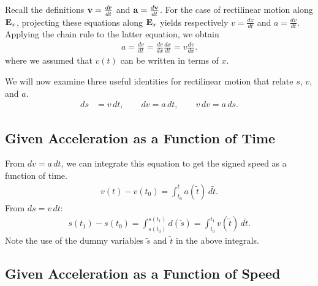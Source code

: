 \documentclass[
  letterpaper,
  DIV=11,
  numbers=noendperiod]{scrreprt}
\begin{document}
Recall the definitions \({\bf v} = \frac{d{\bf r}}{dt}\) and
\({\bf a} = \frac{d{\bf v}}{dt}\). For the case of rectilinear motion
along \({\bf E}_x\), projecting these equations along \({\bf E}_x\)
yields respectively \(v = \frac{dx}{dt}\) and \(a = \frac{dv}{dt}\).
Applying the chain rule to the latter equation, we obtain \begin{align}
    a = \frac{dv}{dt} = \frac{dv}{dx}\frac{dx}{dt} = v\frac{dv}{dx}.
\end{align} where we assumed that \(v(t)\) can be written in terms of
\(x\).

We will now examine three useful identities for rectilinear motion that
relate \(s\), \(v\), and \(a\). \begin{align}
    ds &= v\, dt, \qquad dv = a\, dt, \qquad v\,dv = a\,ds.
\end{align}

\subsection{Given Acceleration as a Function of
Time}\label{given-acceleration-as-a-function-of-time}

From \(dv = a\, dt\), we can integrate this equation to get the signed
speed as a function of time. \begin{align}
    v(t)-v(t_0) = \int_{t_0}^{t}a(\tilde{t})\,d\tilde{t}.
\end{align} From \(ds = v\, dt\): \begin{align}
    s(t_1)-s(t_0) = \int_{s(t_0)}^{s(t_1)}d(\tilde{s}) =\int_{t_0}^{t_1}v(\tilde{t})\,d\tilde{t}.
\end{align} Note the use of the dummy variables \(\tilde{s}\) and
\(\tilde{t}\) in the above integrals.

\subsection{Given Acceleration as a Function of
Speed}\label{given-acceleration-as-a-function-of-speed}
\end{document}
